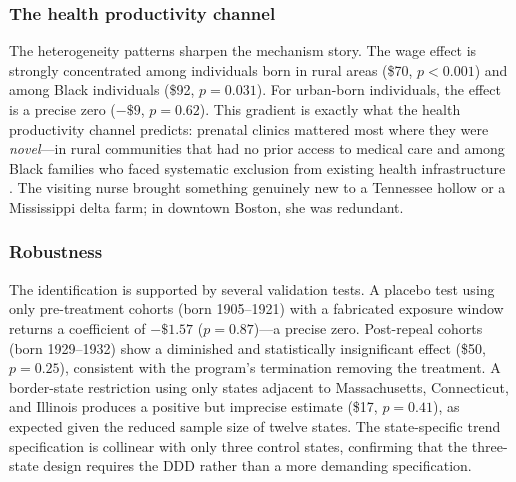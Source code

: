 \documentclass[12pt]{article}
\begin{document}
\subsubsection*{The health productivity channel} The heterogeneity patterns sharpen the mechanism story. The wage effect is strongly concentrated among individuals born in rural areas (\$70, $p < 0.001$) and among Black individuals (\$92, $p = 0.031$). For urban-born individuals, the effect is a precise zero ($-\$9$, $p = 0.62$). This gradient is exactly what the health productivity channel predicts: prenatal clinics mattered most where they were \textit{novel}---in rural communities that had no prior access to medical care and among Black families who faced systematic exclusion from existing health infrastructure \citep{feigenberg2015}. The visiting nurse brought something genuinely new to a Tennessee hollow or a Mississippi delta farm; in downtown Boston, she was redundant.

\subsubsection*{Robustness} The identification is supported by several validation tests. A placebo test using only pre-treatment cohorts (born 1905--1921) with a fabricated exposure window returns a coefficient of $-\$1.57$ ($p = 0.87$)---a precise zero. Post-repeal cohorts (born 1929--1932) show a diminished and statistically insignificant effect (\$50, $p = 0.25$), consistent with the program's termination removing the treatment. A border-state restriction using only states adjacent to Massachusetts, Connecticut, and Illinois produces a positive but imprecise estimate (\$17, $p = 0.41$), as expected given the reduced sample size of twelve states. The state-specific trend specification is collinear with only three control states, confirming that the three-state design requires the DDD rather than a more demanding specification.
\end{document}
